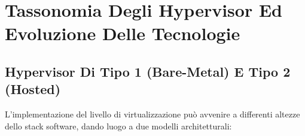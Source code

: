 \documentclass[11pt, a4paper]{article}
\begin{document}
\newpage


\section{Tassonomia Degli Hypervisor Ed Evoluzione Delle Tecnologie}

\subsection{Hypervisor Di Tipo 1 (Bare-Metal) E Tipo 2 (Hosted)}

L'implementazione del livello di virtualizzazione può avvenire a differenti altezze dello stack software, dando luogo a due modelli architetturali:
\end{document}

